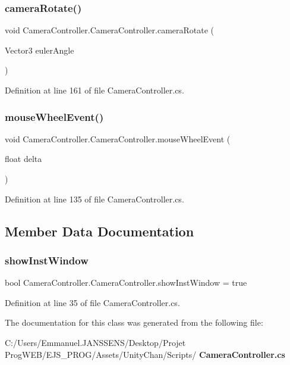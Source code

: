 \subsubsection{camera\+Rotate()}
{\footnotesize\ttfamily void Camera\+Controller.\+Camera\+Controller.\+camera\+Rotate (\begin{DoxyParamCaption}\item[{Vector3}]{euler\+Angle }\end{DoxyParamCaption})}



Definition at line 161 of file Camera\+Controller.\+cs.

\mbox{\label{class_camera_controller_1_1_camera_controller_a3035d8cbbff8729113e9c624882f22e4}} 
\subsubsection{mouse\+Wheel\+Event()}
{\footnotesize\ttfamily void Camera\+Controller.\+Camera\+Controller.\+mouse\+Wheel\+Event (\begin{DoxyParamCaption}\item[{float}]{delta }\end{DoxyParamCaption})}



Definition at line 135 of file Camera\+Controller.\+cs.



\subsection{Member Data Documentation}
\mbox{\label{class_camera_controller_1_1_camera_controller_a69eed8e4fdac60682a7b83ae0eec25cd}} 
\subsubsection{show\+Inst\+Window}
{\footnotesize\ttfamily bool Camera\+Controller.\+Camera\+Controller.\+show\+Inst\+Window = true}



Definition at line 35 of file Camera\+Controller.\+cs.



The documentation for this class was generated from the following file\+:\begin{DoxyCompactItemize}
\item 
C\+:/\+Users/\+Emmanuel.\+J\+A\+N\+S\+S\+E\+N\+S/\+Desktop/\+Projet Prog\+W\+E\+B/\+E\+J\+S\+\_\+\+P\+R\+O\+G/\+Assets/\+Unity\+Chan/\+Scripts/\textbf{ Camera\+Controller.\+cs}\end{DoxyCompactItemize}

